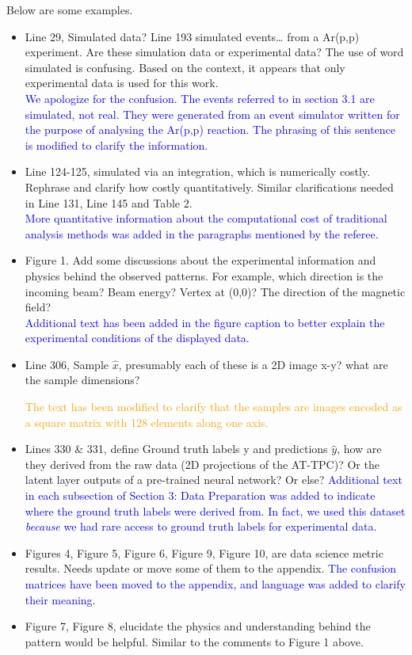 \documentclass[12pt]{article}
\begin{document}
Below are some examples.
\begin{itemize}
\item Line 29, Simulated data? Line 193 simulated events… from a Ar(p,p) experiment. Are these
simulation data or experimental data? The use of word simulated is confusing. Based on the context,
it appears that only experimental data is used for this work.\\
\textcolor{blue}{We apologize for the confusion. The events referred to in section 3.1 are simulated, not real. They were generated from an event simulator written for the purpose of analysing the Ar(p,p) reaction. The phrasing of this sentence is modified to clarify the information.}
\item Line 124-125, simulated via an integration, which is numerically costly. Rephrase and clarify how
costly quantitatively. Similar clarifications needed in Line 131, Line 145 and Table 2.\\
\textcolor{blue}{More quantitative information about the computational cost of traditional analysis methods was added in the paragraphs mentioned by the referee.}
\item Figure 1. Add some discussions about the experimental information and physics behind the
observed patterns. For example, which direction is the incoming beam? Beam energy? Vertex at
(0,0)? The direction of the magnetic field?\\

\textcolor{blue}{Additional text has been added in the figure caption to better explain the experimental conditions of the displayed data.}
\item Line 306, Sample $\hat{x}$, presumably each of these is a 2D image x-y? what are the sample
dimensions?

\textcolor{orange}{The text has been modified to clarify that the samples are images encoded as a square matrix with 128 elements along one axis.}
    
\item Lines 330 \& 331, define Ground truth labels y and predictions $\hat{y}$, how are they derived from
the raw data (2D projections of the AT-TPC)? Or the latent layer outputs of a pre-trained neural
network? Or else?
\textcolor{blue}{Additional text in each subsection of Section 3: Data Preparation was added to indicate where the ground truth labels were derived from. In fact, we used this dataset {\it because} we had rare access to ground truth labels for experimental data.}
\item Figures 4, Figure 5, Figure 6, Figure 9, Figure 10, are data science metric results. Needs update or
move some of them to the appendix.
\textcolor{blue}{The confusion matrices have been moved to the appendix, and language was added to clarify their meaning.}
\item Figure 7, Figure 8, elucidate the physics and understanding behind the pattern would be helpful.
Similar to the comments to Figure 1 above.
\end{itemize}
\end{document}
